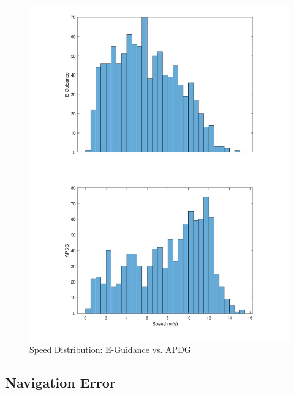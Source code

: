 \begin{figure}[H]
	\centering
	\begin{minipage}{4.3 in}
		\includegraphics[width=\linewidth]{Figures/hspdEvsAPDG.pdf}
		\caption{Speed Distribution: E-Guidance vs. APDG \label{fig:hspdEvsAPDG} }
	\end{minipage}
\end{figure}







\subsection{Navigation Error} \label{sec:naverror}

